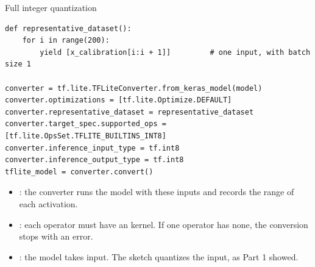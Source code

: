 \begin{frame}[fragile]{Full integer quantization}
\begin{lstlisting}[style=python]
def representative_dataset():
    for i in range(200):
        yield [x_calibration[i:i + 1]]         # one input, with batch size 1

converter = tf.lite.TFLiteConverter.from_keras_model(model)
converter.optimizations = [tf.lite.Optimize.DEFAULT]
converter.representative_dataset = representative_dataset
converter.target_spec.supported_ops = [tf.lite.OpsSet.TFLITE_BUILTINS_INT8]
converter.inference_input_type = tf.int8
converter.inference_output_type = tf.int8
tflite_model = converter.convert()
\end{lstlisting}
  \small
  \begin{itemize}
    \item {}: the converter runs the model with
          these inputs and records the range of each activation.
    \item {}: each operator must have an
           kernel. If one operator has none, the conversion
          stops with an error.
    \item {}: the model takes 
          input. The sketch quantizes the input, as Part 1 showed.
  \end{itemize}
\end{frame}

